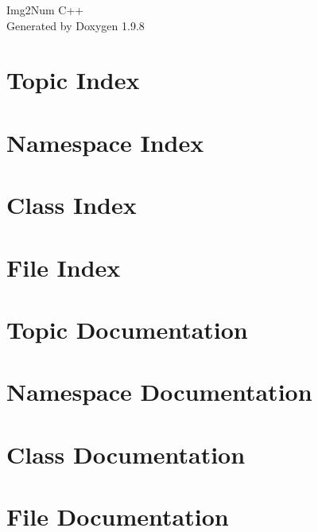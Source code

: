 \documentclass[twoside]{book}
\newcommand{\+}{\discretionary{\mbox{\scriptsize$\hookleftarrow$}}{}{}}
\newcommand{\clearemptydoublepage}{%
    \newpage{\pagestyle{empty}\cleardoublepage}%
  }
\begin{document}
  \raggedbottom
    \hypersetup{pageanchor=false,
                bookmarksnumbered=true,
                pdfencoding=unicode
               }
  \begin{titlepage}
  \vspace*{7cm}
  \begin{center}%
  {\Large Img2\+Num C++}\\
  \vspace*{1cm}
  {\large Generated by Doxygen 1.9.8}\\
  \end{center}
  \end{titlepage}
  \clearemptydoublepage
  \tableofcontents
  \clearemptydoublepage
  \hypersetup{pageanchor=true}

\chapter{Topic Index}

\chapter{Namespace Index}

\chapter{Class Index}

\chapter{File Index}

\chapter{Topic Documentation}

\chapter{Namespace Documentation}

\chapter{Class Documentation}



\chapter{File Documentation}



  \backmatter
  \newpage
  \clearemptydoublepage
  \printindex
\end{document}
